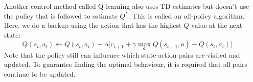 \documentclass[a4paper, 11pt]{article}
\begin{document}
Another control method called Q-learning also uses TD estimates but doesn't use the policy that is followed to estimate $Q^*$. This is called an off-policy algorithm. Here, we do a backup using the action that has the highest $Q$ value at the next state:
\begin{equation}
Q(s_t,a_t) \leftarrow Q(s_t,a_t) + \alpha \big[ r_{t+1} + \gamma \max_{a} Q(s_{t+1}, a) - Q(s_t,a_t) \big]
\end{equation}
Note that the policy still can influence which state-action pairs are visited and updated. To guarantee finding the optimal behaviour, it is required that all pairs continue to be updated.\\

\end{document}
